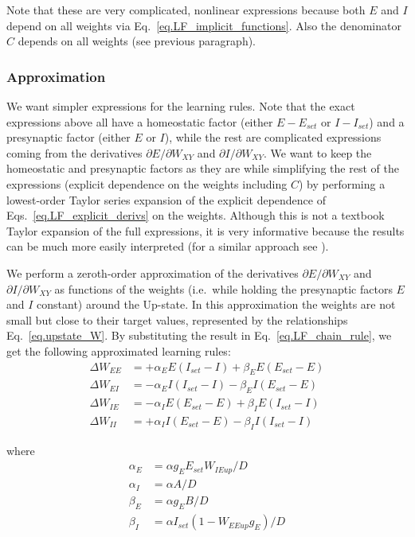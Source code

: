 \documentclass[twocolumn]{article}
\newcommand{\EE}{\mathit{EE}}
\newcommand{\EI}{\mathit{EI}}
\newcommand{\IE}{\mathit{IE}}
\newcommand{\II}{\mathit{II}}
\newcommand{\XY}{\mathit{XY}}
\newcommand{\set}{\mathit{set}}
\newcommand{\up}{\mathit{up}}
\begin{document}
\noindent Note that these are very complicated, nonlinear expressions because both $E$ and $I$ depend on all weights via Eq.\ \ref{eq.LF_implicit_functions}. Also the denominator $C$ depends on all weights (see previous paragraph).


\subsubsection{Approximation}

We want simpler expressions for the learning rules. Note that the exact expressions above all have a homeostatic factor (either $E - E_{\set}$ or $I - I_{\set}$) and a presynaptic factor (either $E$ or $I$), while the rest are complicated expressions coming from the derivatives $\partial E/\partial W_{\XY}$ and  $\partial I/\partial W_{\XY}$. We want to keep the homeostatic and presynaptic factors as they are while simplifying the rest of the expressions (explicit dependence on the weights including $C$) by performing a lowest-order Taylor series expansion of the explicit dependence of Eqs.\ \ref{eq.LF_explicit_derivs} on the weights. Although this is not a textbook Taylor expansion of the full expressions, it is very informative because the results can be much more easily interpreted (for a similar approach see \cite{Mackwood2020}).

We perform a zeroth-order approximation of the derivatives $\partial E/\partial W_{\XY}$ and  $\partial I/\partial W_{\XY}$ as functions of the weights (i.e.\ while holding the presynaptic factors $E$ and $I$ constant) around the Up-state. In this approximation the weights are not small but close to their target values, represented by the relationships Eq.\ \ref{eq.upstate_W}. By substituting the result in Eq.\ \ref{eq.LF_chain_rule}, we get the following approximated learning rules:
\begin{equation}
\begin{aligned}
\Delta W_{\EE} & = + \alpha_E E(I_{\set} - I) + \beta_E E(E_{\set} - E) \\
\Delta W_{\EI} & = - \alpha_E I(I_{\set} - I) - \beta_E I(E_{\set} - E) \\
\Delta W_{\IE} & = - \alpha_I E(E_{\set} - E) + \beta_I E(I_{\set} - I) \\
\Delta W_{\II} & = + \alpha_I I(E_{\set} - E) - \beta_I I(I_{\set} - I)
\end{aligned}
\label{eq.LF_approx}
\end{equation}

\noindent where
\begin{displaymath}
\begin{aligned}
\alpha_E & = \alpha g_E E_{\set} W_{\IE\up}/D \\
\alpha_I & = \alpha A/D \\
\beta_E & = \alpha g_E B/D \\
\beta_I & = \alpha I_{\set} (1 - W_{\EE\up} g_E)/D
\end{aligned}
\end{displaymath}
\end{document}

